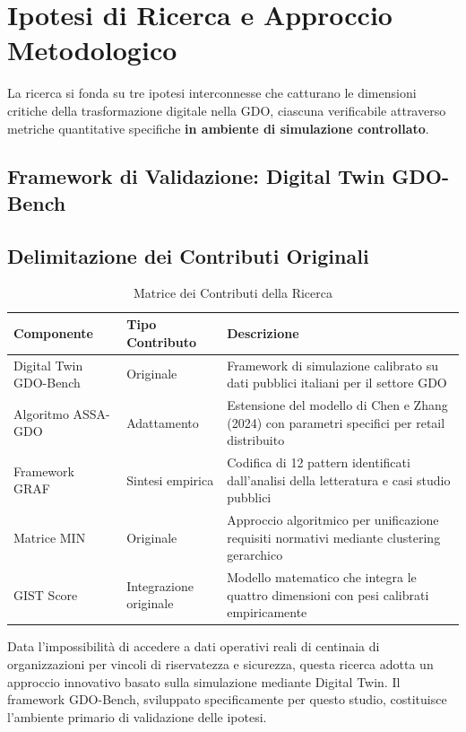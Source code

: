 \section{\texorpdfstring{Ipotesi di Ricerca e Approccio Metodologico}{1.4 - Ipotesi di Ricerca e Approccio Metodologico}}
\label{sec:ipotesi_metodologia}

La ricerca si fonda su tre ipotesi interconnesse che catturano le dimensioni critiche della trasformazione digitale nella GDO, ciascuna verificabile attraverso metriche quantitative specifiche \textbf{in ambiente di simulazione controllato}.

\subsection{Framework di Validazione: Digital Twin GDO-Bench}

\subsection{Delimitazione dei Contributi Originali}

\begin{table}[h!]
\centering
\caption{Matrice dei Contributi della Ricerca}
\begin{tabular}{|p{3.5cm}|p{3cm}|p{7cm}|}
\hline
\textbf{Componente} & \textbf{Tipo Contributo} & \textbf{Descrizione} \\
\hline
Digital Twin GDO-Bench & Originale & Framework di simulazione calibrato su dati pubblici italiani per il settore GDO \\
\hline
Algoritmo ASSA-GDO & Adattamento & Estensione del modello di Chen e Zhang (2024) con parametri specifici per retail distribuito \\
\hline
Framework GRAF & Sintesi empirica & Codifica di 12 pattern identificati dall'analisi della letteratura e casi studio pubblici \\
\hline
Matrice MIN & Originale & Approccio algoritmico per unificazione requisiti normativi mediante clustering gerarchico \\
\hline
GIST Score & Integrazione originale & Modello matematico che integra le quattro dimensioni con pesi calibrati empiricamente \\
\hline
\end{tabular}
\end{table}

Data l'impossibilità di accedere a dati operativi reali di centinaia di organizzazioni per vincoli di riservatezza e sicurezza, questa ricerca adotta un approccio innovativo basato sulla simulazione mediante Digital Twin. Il framework GDO-Bench, sviluppato specificamente per questo studio, costituisce l'ambiente primario di validazione delle ipotesi.

